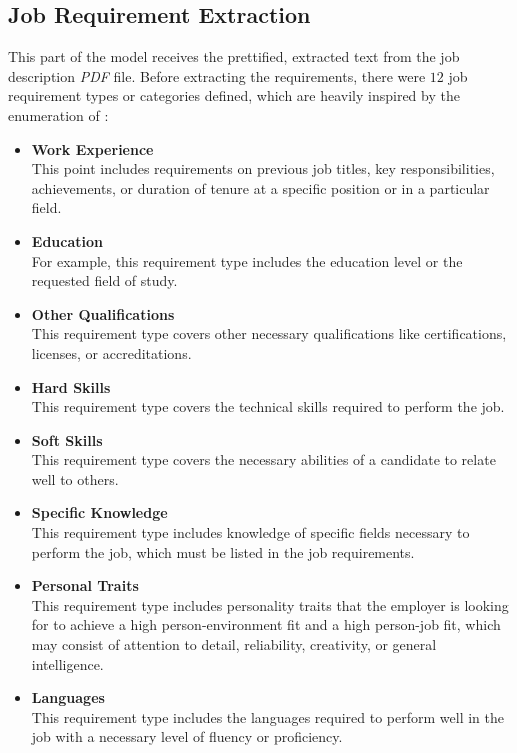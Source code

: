 \documentclass[draft,final]{thesisclass} %
\begin{document}
\subsection{Job Requirement Extraction} \label{job_requirement_extraction}
This part of the model receives the prettified, extracted text from the job description \textit{PDF} file.
Before extracting the requirements, there were $12$ job requirement types or categories defined, which are heavily inspired by the enumeration of \textcite{job_requirement_types}:
\begin{itemize} \label{job_requirement_types}
    \item \textbf{Work Experience}\\
    This point includes requirements on previous job titles, key responsibilities, achievements, or duration of tenure at a specific position or in a particular field.
    \item \textbf{Education}\\
    For example, this requirement type includes the education level or the requested field of study.
    \item \textbf{Other Qualifications}\\
    This requirement type covers other necessary qualifications like certifications, licenses, or accreditations.
    \item \textbf{Hard Skills}\\
    This requirement type covers the technical skills required to perform the job.
    \item \textbf{Soft Skills}\\
    This requirement type covers the necessary abilities of a candidate to relate well to others.
    \item \textbf{Specific Knowledge}\\
    This requirement type includes knowledge of specific fields necessary to perform the job, which must be listed in the job requirements.
    \item \textbf{Personal Traits}\\
    This requirement type includes personality traits that the employer is looking for to achieve a high person-environment fit and a high person-job fit, which may consist of attention to detail, reliability, creativity, or general intelligence.
    \item \textbf{Languages}\\
    This requirement type includes the languages required to perform well in the job with a necessary level of fluency or proficiency.

\end{itemize}
\end{document}
